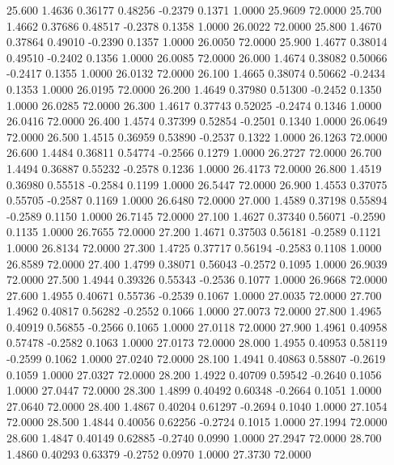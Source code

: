   25.600   1.4636   0.36177   0.48256  -0.2379   0.1371   1.0000  25.9609  72.0000
  25.700   1.4662   0.37686   0.48517  -0.2378   0.1358   1.0000  26.0022  72.0000
  25.800   1.4670   0.37864   0.49010  -0.2390   0.1357   1.0000  26.0050  72.0000
  25.900   1.4677   0.38014   0.49510  -0.2402   0.1356   1.0000  26.0085  72.0000
  26.000   1.4674   0.38082   0.50066  -0.2417   0.1355   1.0000  26.0132  72.0000
  26.100   1.4665   0.38074   0.50662  -0.2434   0.1353   1.0000  26.0195  72.0000
  26.200   1.4649   0.37980   0.51300  -0.2452   0.1350   1.0000  26.0285  72.0000
  26.300   1.4617   0.37743   0.52025  -0.2474   0.1346   1.0000  26.0416  72.0000
  26.400   1.4574   0.37399   0.52854  -0.2501   0.1340   1.0000  26.0649  72.0000
  26.500   1.4515   0.36959   0.53890  -0.2537   0.1322   1.0000  26.1263  72.0000
  26.600   1.4484   0.36811   0.54774  -0.2566   0.1279   1.0000  26.2727  72.0000
  26.700   1.4494   0.36887   0.55232  -0.2578   0.1236   1.0000  26.4173  72.0000
  26.800   1.4519   0.36980   0.55518  -0.2584   0.1199   1.0000  26.5447  72.0000
  26.900   1.4553   0.37075   0.55705  -0.2587   0.1169   1.0000  26.6480  72.0000
  27.000   1.4589   0.37198   0.55894  -0.2589   0.1150   1.0000  26.7145  72.0000
  27.100   1.4627   0.37340   0.56071  -0.2590   0.1135   1.0000  26.7655  72.0000
  27.200   1.4671   0.37503   0.56181  -0.2589   0.1121   1.0000  26.8134  72.0000
  27.300   1.4725   0.37717   0.56194  -0.2583   0.1108   1.0000  26.8589  72.0000
  27.400   1.4799   0.38071   0.56043  -0.2572   0.1095   1.0000  26.9039  72.0000
  27.500   1.4944   0.39326   0.55343  -0.2536   0.1077   1.0000  26.9668  72.0000
  27.600   1.4955   0.40671   0.55736  -0.2539   0.1067   1.0000  27.0035  72.0000
  27.700   1.4962   0.40817   0.56282  -0.2552   0.1066   1.0000  27.0073  72.0000
  27.800   1.4965   0.40919   0.56855  -0.2566   0.1065   1.0000  27.0118  72.0000
  27.900   1.4961   0.40958   0.57478  -0.2582   0.1063   1.0000  27.0173  72.0000
  28.000   1.4955   0.40953   0.58119  -0.2599   0.1062   1.0000  27.0240  72.0000
  28.100   1.4941   0.40863   0.58807  -0.2619   0.1059   1.0000  27.0327  72.0000
  28.200   1.4922   0.40709   0.59542  -0.2640   0.1056   1.0000  27.0447  72.0000
  28.300   1.4899   0.40492   0.60348  -0.2664   0.1051   1.0000  27.0640  72.0000
  28.400   1.4867   0.40204   0.61297  -0.2694   0.1040   1.0000  27.1054  72.0000
  28.500   1.4844   0.40056   0.62256  -0.2724   0.1015   1.0000  27.1994  72.0000
  28.600   1.4847   0.40149   0.62885  -0.2740   0.0990   1.0000  27.2947  72.0000
  28.700   1.4860   0.40293   0.63379  -0.2752   0.0970   1.0000  27.3730  72.0000
